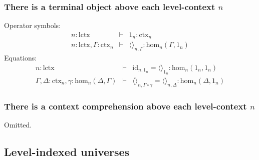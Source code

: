 \documentclass[11pt,a4paper]{article}
\theoremstyle{definition}
\newcommand{\id}{\mathsf{id}}
\def\Hom{\mathrm{hom}}
\def\id{\mathrm{id}}
\def\lctx{\mathrm{lctx}}
\newcommand{\ctx}{\mathrm{ctx}}
\newcommand{\tuple}[1]{\langle #1 \rangle}
\begin{document}
\subsubsection{There is a terminal object above each level-context $n$}

Operator symbols:
\begin{eqnarray*}
n : \lctx &\vdash& 1_n : \ctx_n\\
n : \lctx, \Gamma : \ctx_n &\vdash& \tuple{}_{n,\Gamma} : \Hom_n(\Gamma,1_n)
\end{eqnarray*}
Equations:
\begin{eqnarray*}
n : \lctx &\vdash& \id_{n,1_n} = \tuple{}_{1_n} : \Hom_n(1_n,1_n)\\
\Gamma,\Delta : \ctx_n , \gamma : \Hom_n (\Delta,\Gamma) &\vdash&
\tuple{}_{n,\Gamma\circ\gamma} = \tuple{}_{n,\Delta} : \Hom_n (\Delta,1_n )
\end{eqnarray*}


\subsubsection{There is a context comprehension above each level-context $n$}

Omitted.

\subsection{Level-indexed universes}
\end{document}
